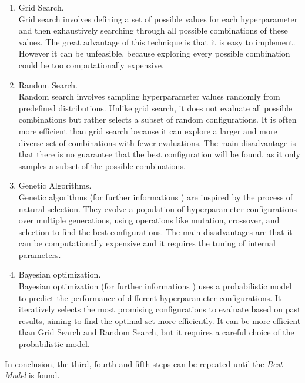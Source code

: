 \begin{enumerate}
    \item Grid Search.\\
    Grid search involves defining a set of possible values for each hyperparameter and then exhaustively searching through all 
    possible combinations of these values.
    The great advantage of this technique is that it is easy to implement.
    However it can be unfeasible, because exploring every possible combination could be too computationally expensive.

    \item Random Search.\\
    Random search involves sampling hyperparameter values randomly from predefined distributions. Unlike grid search, 
    it does not evaluate all possible combinations but rather selects a subset of random configurations.
    It is often more efficient than grid search because it can explore a larger and more diverse set of combinations with fewer evaluations.
    The main disadvantage is that there is no guarantee that the best configuration will be found, as it only samples a subset of the 
    possible combinations.

    \item Genetic Algorithms.\\
    Genetic algorithms (for further informations \cite{alam2020}) are inspired by the process of natural selection. They evolve a population of hyperparameter configurations 
    over multiple generations, using operations like mutation, crossover, and selection to find the best configurations.
    The main disadvantages are that it can be computationally expensive and it requires the tuning of internal parameters.

    \item Bayesian optimization.\\
    Bayesian optimization (for further informations \cite{frazier2018}) uses a probabilistic model to predict the performance of different hyperparameter configurations. 
    It iteratively selects the most promising configurations to evaluate based on past results, aiming to find the optimal set more efficiently.
    It can be more efficient than Grid Search and Random Search, but it requires a careful choice of the probabilistic model.

\end{enumerate}

In conclusion, the third, fourth and fifth steps can be repeated until the \textit{Best Model} is found.


